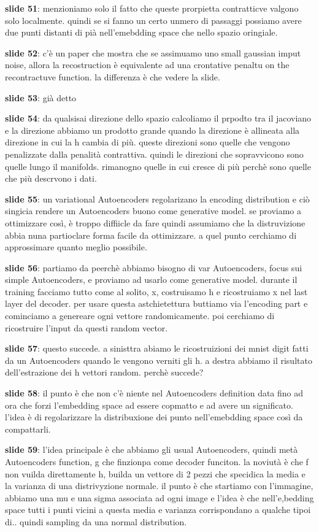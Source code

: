 \textbf{slide 51}: menzioniamo solo il fatto che queste prorpietta contratticve valgono solo localmente.
quindi se si fanno un certo unmero di passaggi possiamo avere due punti distanti di pià nell'emebdding space
che nello spazio oringiale.

\textbf{slide 52}: c'è un paper che mostra che se assimuamo uno small gaussian imput noise, allora la 
recostruction è equivalente ad una crontative penaltu on the recontractuve function. la differenza è che
vedere la slide.

\textbf{slide 53}: già detto

\textbf{slide 54}: da qualsisai direzione dello spazio calcoliamo il prpodto tra il jacoviano e la direzione
abbiamo un prodotto grande quando la direzione è allineata alla direzione in cui la h cambia di più. 
queste direzioni sono quelle che vengono penalizzate dalla penalità contrattiva. quindi le direzioni che 
sopravvicono sono quelle lungo il manifolds. rimanogno quelle in cui cresce di più perchè sono quelle
che più descrvono i dati.

\textbf{slide 55}: un variational Autoencoders regolarizano la encoding distribution e ciò singicia 
rendere un Autoencoders buono come generative model. se proviamo a ottimizzare così, è troppo diffiicle
da fare quindi assumiamo che la distruvizione abbia nuna partioclare forma facile da ottimizzare. a quel punto
cerchiamo di approssimare quanto meglio possibile.

\textbf{slide 56}: partiamo da peerchè abbiamo bisogno di var Autoencoders, focus sui simple Autoencoders,
e proviamo ad usarlo come generative model. durante il training facciamo tutto come al solito, x, costruisamo
h e ricostruiamo x nel last layer del decoder. per usare questa astchietettura buttiamo via l'encoding part
e cominciamo a genereare ogni vettore randomicamente. poi cerchiamo di ricostruire l'input da questi random
vector. 

\textbf{slide 57}: questo succede. a sinisttra abiamo le ricostruizioni dei mnist digit fatti da un 
Autoencoders quando le vengono verniti gli h. a destra abbiamo il risultato dell'estrazione dei h vettori
random. perchè succede?

\textbf{slide 58}: il punto è che non c'è niente nel Autoencoders definition data fino ad ora che forzi
l'embedding space ad essere copmatto e ad avere un significato. l'idea è di regolarizzare la distribuxione
dei punto nell'emebdding space così da compattarli. 

\textbf{slide 59}: l'idea principale è che abbiamo gli usual Autoencoders, quindi metà Autoencoders function,
g che finzionpa come decoder funciton. la noviutà è che f non vuilda direttamente h, builda un vettore 
di 2 pezzi che specidica la media e la varianza di una distrivyzione normale. il punto è che startiamo con
l'immagine, abbiamo una mu e una sigma associata ad ogni image e l'idea è che nell'e,bedding space tutti i 
punti vicini a questa media e varianza corrispondano a qualche tipoi di.. quindi sampling da una normal 
distribution.

